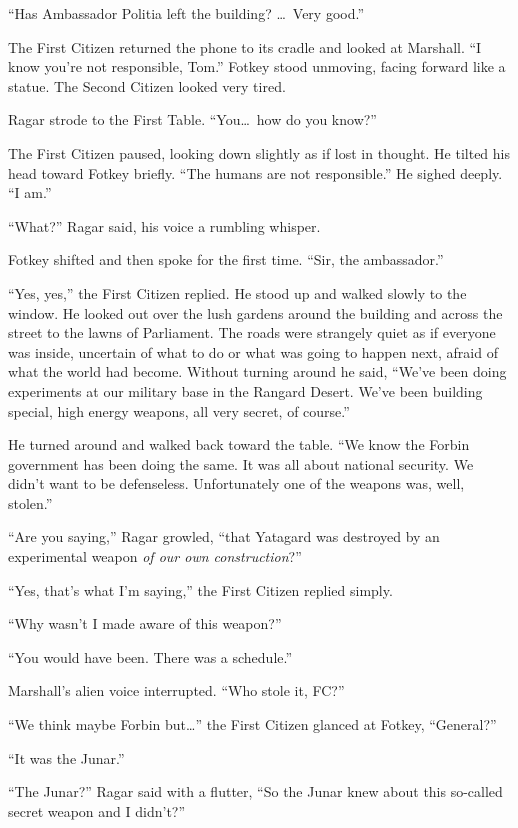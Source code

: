 ``Has Ambassador Politia left the building? \ldots\ Very good.''

The First Citizen returned the phone to its cradle and looked at Marshall. ``I know you're not
responsible, Tom.'' Fotkey stood unmoving, facing forward like a statue. The Second Citizen
looked very tired.

Ragar strode to the First Table. ``You\ldots\ how do you know?''

The First Citizen paused, looking down slightly as if lost in thought. He tilted his head toward
Fotkey briefly. ``The humans are not responsible.'' He sighed deeply. ``I am.''

``What?'' Ragar said, his voice a rumbling whisper.

Fotkey shifted and then spoke for the first time. ``Sir, the ambassador.''

``Yes, yes,'' the First Citizen replied. He stood up and walked slowly to the window. He looked
out over the lush gardens around the building and across the street to the lawns of Parliament.
The roads were strangely quiet as if everyone was inside, uncertain of what to do or what was
going to happen next, afraid of what the world had become. Without turning around he said,
``We've been doing experiments at our military base in the Rangard Desert. We've been building
special, high energy weapons, all very secret, of course.''

He turned around and walked back toward the table. ``We know the Forbin government has been
doing the same. It was all about national security. We didn't want to be defenseless.
Unfortunately one of the weapons was, well, stolen.''

``Are you saying,'' Ragar growled, ``that Yatagard was destroyed by an experimental weapon
\emph{of our own construction}?''

``Yes, that's what I'm saying,'' the First Citizen replied simply.

``Why wasn't I made aware of this weapon?''

``You would have been. There was a schedule.''

Marshall's alien voice interrupted. ``Who stole it, FC?''

``We think maybe Forbin but\ldots'' the First Citizen glanced at Fotkey, ``General?''

``It was the Junar.''

``The Junar?'' Ragar said with a flutter, ``So the Junar knew about this so-called secret weapon
and I didn't?''

